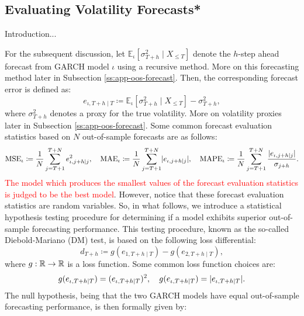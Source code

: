 \newpage
\subsection{Evaluating Volatility Forecasts*}\label{ss:evf-dm}
Introduction...

For the subsequent discussion, let $\mathbb{E}_{\iota}[\sigma_{T+h}^{2}\mid X_{\leq T}]$ denote the $h$-step ahead forecast from GARCH model $\iota$ using a recursive method. More on this forecasting method later in Subsection \ref{ss:app-oos-forecast}. Then, the corresponding forecast error is defined as:
\begin{equation}\label{eq:forecasterror}
    e_{\iota,T+h\mid T}\coloneqq\mathbb{E}_{\iota}[\sigma_{T+h}^{2}\mid X_{\leq T}]-\sigma_{T+h}^{2},
\end{equation}
where $\sigma_{T+h}^{2}$ denotes a proxy for the true volatility. More on volatility proxies later in Subsection \ref{ss:app-oos-forecast}.
Some common forecast evaluation statistics based on $N$ out-of-sample forecasts are as follows:
\begin{equation*}
    \mathrm{MSE}_{\iota}\coloneqq\frac{1}{N}\sum_{j=T+1}^{T+N}e_{\iota,j+h\mid j}^{2},\quad\mathrm{MAE}_{\iota}\coloneqq\frac{1}{N}\sum_{j=T+1}^{T+N}\lvert e_{\iota,j+h\mid j}\rvert,\quad\mathrm{MAPE}_{\iota}\coloneqq\frac{1}{N}\sum_{j=T+1}^{T+N}\frac{\lvert e_{\iota,j+h\mid j}\rvert}{\sigma_{j+h}}.
\end{equation*}
\textcolor{red}{The model which produces the smallest values of the forecast evaluation statistics is judged to be the best model}. However, notice that these forecast evaluation statistics are random variables. So, in what follows, we introduce a statistical hypothesis testing procedure for determining if a model exhibits superior out-of-sample forecasting performance. This testing procedure, known as the so-called Diebold-Mariano (DM) test, is based on the following loss differential:
\begin{equation*}
    d_{T+h}\coloneqq g(e_{1,T+h\mid T})-g(e_{2,T+h\mid T}),
\end{equation*}
where $g:\mathbb{R}\to\mathbb{R}$ is a loss function. Some common loss function choices are:
\begin{equation*}
    g(e_{\iota,T+h\mid T})=(e_{\iota,T+h\mid T})^{2},\quad g(e_{\iota,T+h\mid T})=\lvert e_{\iota,T+h\mid T}\rvert.
\end{equation*}
The null hypothesis, being that the two GARCH models have equal out-of-sample forecasting performance, is then formally given by: 
